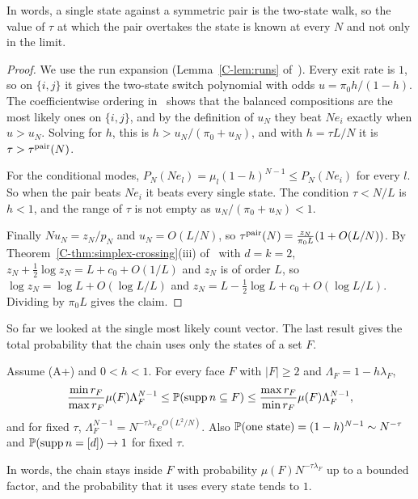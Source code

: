 In words, a single state against a symmetric pair is the two-state walk, so the
value of $\tau$ at which the pair overtakes the state is known at every $N$ and
not only in the limit.

\begin{proof}
We use the run expansion (Lemma~\ref*{C-lem:runs} of~\cite{paperC}). Every exit
rate is $1$, so on $\{i,j\}$ it gives the two-state switch polynomial with
odds $u=\pi_0h/(1-h)$. The coefficientwise ordering
in~\cite[Proposition (ordering the crossings)]{paperA} shows that the balanced
compositions are the most likely ones on $\{i,j\}$, and by the definition of
$u_N$ they beat $Ne_i$ exactly when $u>u_N$. Solving for $h$, this is
$h>u_N/(\pi_0+u_N)$, and with $h=\tau L/N$ it is $\tau>\tau^{\rm pair}(N)$.

For the conditional modes, $P_N(Ne_l)=\mu_l(1-h)^{N-1}\le P_N(Ne_i)$ for every $l$.
So when the pair beats $Ne_i$ it beats every single state. The condition
$\tau<N/L$ is $h<1$, and the range of $\tau$ is not empty as
$u_N/(\pi_0+u_N)<1$.

Finally $Nu_N=z_N/p_N$ and $u_N=O(L/N)$, so
$\tau^{\rm pair}(N)=\frac{z_N}{\pi_0L}(1+O(L/N))$. By
Theorem~\ref*{C-thm:simplex-crossing}(iii) of~\cite{paperC} with $d=k=2$,
$z_N+\frac12\log z_N=L+c_0+O(1/L)$ and $z_N$ is of
order $L$, so $\log z_N=\log L+O(\log L/L)$ and
$z_N=L-\frac12\log L+c_0+O(\log L/L)$. Dividing by $\pi_0L$ gives the claim.
\end{proof}

So far we looked at the single most likely count vector. The last result
gives the total probability that the chain uses only the states of a set $F$.

\begin{proposition}\label{prop:mass}
Assume \textup{(A+)} and $0<h<1$. For every face $F$ with $|F|\ge2$ and
$\Lambda_F=1-h\lambda_F$,
\[
 \frac{\min r_F}{\max r_F}\mu(F)\Lambda_F^{N-1}
 \le\mathbb P(\operatorname{supp} n\subseteq F)\le
 \frac{\max r_F}{\min r_F}\mu(F)\Lambda_F^{N-1},
\]
and for fixed $\tau$, $\Lambda_F^{N-1}=N^{-\tau\lambda_F}e^{O(L^2/N)}$. Also
$\mathbb P(\text{one state})=(1-h)^{N-1}\sim N^{-\tau}$ and
$\mathbb P(\operatorname{supp} n=[d])\to1$ for fixed $\tau$.
\end{proposition}

In words, the chain stays inside $F$ with probability
$\mu(F)N^{-\tau\lambda_F}$ up to a bounded factor, and the probability that it
uses every state tends to $1$.

